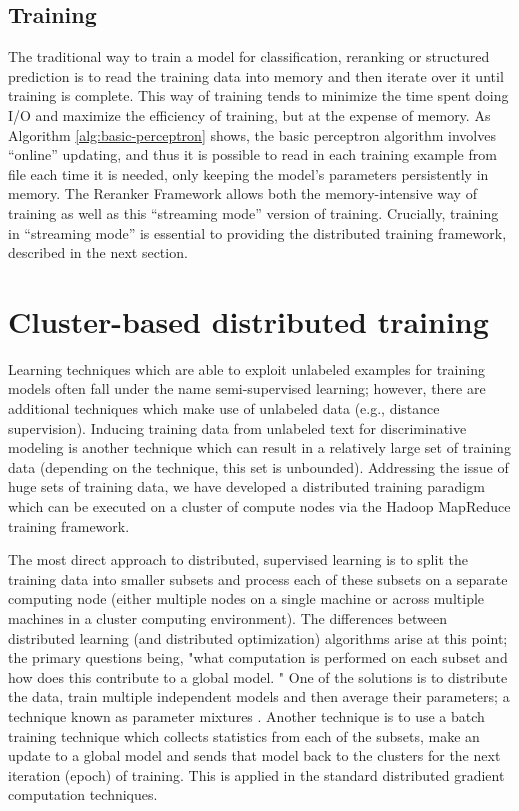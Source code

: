 \documentclass[a4paper]{article}
\let\textquotedbl="
\begin{document}
\subsection{Training}

The traditional way to train a model for classification, reranking
or structured prediction is to read the training data into memory
and then iterate over it until training is complete. This way of training
tends to minimize the time spent doing I/O and maximize the efficiency
of training, but at the expense of memory. As Algorithm \ref{alg:basic-perceptron}
shows, the basic perceptron algorithm involves ``online'' updating,
and thus it is possible to read in each training example from file
each time it is needed, only keeping the model's parameters persistently
in memory. The Reranker Framework allows both the memory-intensive
way of training as well as this ``streaming mode'' version of training.
Crucially, training in ``streaming mode'' is essential to providing
the distributed training framework, described in the next section.


\section{Cluster-based distributed training}

Learning techniques which are able to exploit unlabeled examples for
training models often fall under the name semi-supervised learning;
however, there are additional techniques which make use of unlabeled
data (e.g., distance supervision\cite{mintz09}). Inducing training
data from unlabeled text for discriminative modeling is another technique which
can result in a relatively large set of training data (depending on the
technique, this set is unbounded). Addressing the issue of huge sets of training
data, we have developed a distributed training paradigm which can be executed on
a cluster of compute nodes via the Hadoop MapReduce training framework.

The most direct approach to distributed, supervised learning is to
split the training data into smaller subsets and process each of these
subsets on a separate computing node (either multiple nodes on a single
machine or across multiple machines in a cluster computing environment).
The differences between distributed learning (and distributed optimization)
algorithms arise at this point; the primary questions being,
 \textquotedbl{}what computation is performed on each subset and how does this
contribute to a global model.  \textquotedbl{}
One of the solutions is to distribute the data, train multiple
independent models and then average their parameters; a technique known
as parameter mixtures \cite{gmann2009}. Another technique is to use a batch training
technique which collects statistics from each of the subsets, make
an update to a global model and sends that model back to the clusters
for the next iteration (epoch) of training. This is applied in the
standard distributed gradient computation techniques.
\end{document}
